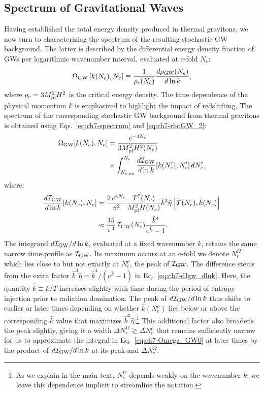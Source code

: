 \subsection{Spectrum of Gravitational Waves}
Having established the total energy density produced in thermal gravitons, we now turn to characterizing the spectrum of the resulting stochastic GW background. The latter is described by the differential energy density fraction of GWs per logarithmic wavenumber interval, evaluated at e-fold $N_e$:
\begin{equation}
    \Omega_{\rm GW}\left[k(N_e),N_e\right]\equiv \frac{1}{\rho_c(N_e)}\frac{d\rho_{\rm GW}(N_e)}{d\ln k},
    \label{eq:ch7-spectrum}
\end{equation}
where $\rho_c=3 M_{\rm pl}^2 H^2$ is the critical energy density. The time dependence of the physical momentum $k$ is emphasized to highlight the impact of redshifting. The spectrum of the corresponding stochastic GW background from thermal gravitons is obtained using Eqs.~\eqref{eq:ch7-spectrum} and \eqref{eq:ch7-rhoGW_2}:
\begin{align}
\nonumber    \Omega_{\rm GW}[k(N_e),N_e]&=\frac{e^{-4N_e}}{3 M_{\rm pl}^2H^2(N_e)}\\
    &\times\int_{N_{e,{\rm ini}}}^{N_e} \frac{d\mathcal{I}_{\rm GW}}{d\ln k}[k(N_e^\prime),N_e^\prime]\,dN_e^\prime, \label{eq:ch7-Omega_GW0}
\end{align}
where:
\begin{align}
\nonumber    \frac{d\mathcal{I}_{\rm GW}}{d\ln k}[k(N_e),N_e]&=\frac{2\,e^{4N_e}}{\pi^2}\frac{T^7(N_e)}{M_{\rm pl}^2 H(N_e)} \hat k^3 \hat{\eta}\left[T(N_e),\hat k(N_e)\right] \\
    &\approx \frac{15}{\pi^4}\,\mathcal{I}_{\rm GW}(N_e) \frac{\hat k^4}{e^{\hat k}-1}. \label{eq:ch7-dIgw_dlnk}
\end{align}
The integrand $d\mathcal{I}_{\rm GW}/d\ln k$, evaluated at a fixed wavenumber $k$, retains the same narrow time profile as $\mathcal{I}_{\rm GW}$. Its maximum occurs at an e-fold we denote $N_e^\Omega$ which lies close to but not exactly at $N_e^\rho$, the peak of $\mathcal{I}_{\rm GW}$. The difference stems from the extra factor
$\hat k^3 \hat\eta =
\hat k^4/(e^{\hat k}-1)$ in Eq.~\eqref{eq:ch7-dIgw_dlnk}.
Here, the quantity  $\hat k \equiv k/T$ increases slightly with time during the period of entropy injection prior to radiation domination. The peak of $d\mathcal{I}_{\rm GW}/d\ln k$ thus shifts to earlier or later times depending on whether
$\hat k(N_e^\rho)$ lies below or above the corresponding $\hat k$ value that maximizes $\hat k^3 \hat\eta$.\footnote{As we explain in the main text, $N_e^\Omega$ depends weakly on the wavenumber $k$; we leave this dependence implicit to streamline the notation.} This additional factor also broadens the peak slightly, giving it a width $\Delta N_e^\Omega\gtrsim \Delta N_e^\rho$ that remains sufficiently narrow for us to approximate the integral in Eq.~\eqref{eq:ch7-Omega_GW0} at later times by the product of $d\mathcal{I}_{\rm GW}/d\ln k$ at its peak and $\Delta N_e^\Omega$.


